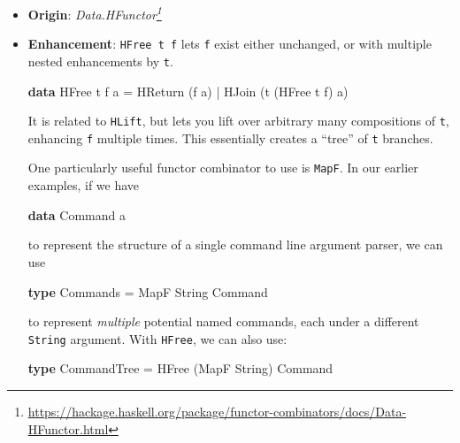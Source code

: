 \documentclass[]{article}
\newenvironment{Shaded}{}{}
\newcommand{\DataTypeTok}[1]{\textcolor[rgb]{0.56,0.13,0.00}{#1}}
\newcommand{\KeywordTok}[1]{\textcolor[rgb]{0.00,0.44,0.13}{\textbf{#1}}}
\newcommand{\NormalTok}[1]{#1}
\newcommand{\OperatorTok}[1]{\textcolor[rgb]{0.40,0.40,0.40}{#1}}
\newcommand{\OtherTok}[1]{\textcolor[rgb]{0.00,0.44,0.13}{#1}}
\renewcommand{\href}[2]{#2\footnote{\url{#1}}}
\begin{document}
\begin{itemize}
\item
  \textbf{Origin}:
  \emph{\href{https://hackage.haskell.org/package/functor-combinators/docs/Data-HFunctor.html}{Data.HFunctor}}
\item
  \textbf{Enhancement}: \texttt{HFree\ t\ f} lets \texttt{f} exist either
  unchanged, or with multiple nested enhancements by \texttt{t}.

\begin{Shaded}
\begin{Highlighting}[]
\KeywordTok{data} \DataTypeTok{HFree}\NormalTok{ t f a}
    \OtherTok{=} \DataTypeTok{HReturn}\NormalTok{ (f a)}
    \OperatorTok{|} \DataTypeTok{HJoin}\NormalTok{   (t (}\DataTypeTok{HFree}\NormalTok{ t f) a)}
\end{Highlighting}
\end{Shaded}

  It is related to \texttt{HLift}, but lets you lift over arbitrary many
  compositions of \texttt{t}, enhancing \texttt{f} multiple times. This
  essentially creates a ``tree'' of \texttt{t} branches.

  One particularly useful functor combinator to use is \texttt{MapF}. In our
  earlier examples, if we have

\begin{Shaded}
\begin{Highlighting}[]
\KeywordTok{data} \DataTypeTok{Command}\NormalTok{ a}
\end{Highlighting}
\end{Shaded}

  to represent the structure of a single command line argument parser, we can
  use

\begin{Shaded}
\begin{Highlighting}[]
\KeywordTok{type} \DataTypeTok{Commands} \OtherTok{=} \DataTypeTok{MapF} \DataTypeTok{String} \DataTypeTok{Command}
\end{Highlighting}
\end{Shaded}

  to represent \emph{multiple} potential named commands, each under a different
  \texttt{String} argument. With \texttt{HFree}, we can also use:

\begin{Shaded}
\begin{Highlighting}[]
\KeywordTok{type} \DataTypeTok{CommandTree} \OtherTok{=} \DataTypeTok{HFree}\NormalTok{ (}\DataTypeTok{MapF} \DataTypeTok{String}\NormalTok{) }\DataTypeTok{Command}
\end{Highlighting}
\end{Shaded}


\end{itemize}
\end{document}
